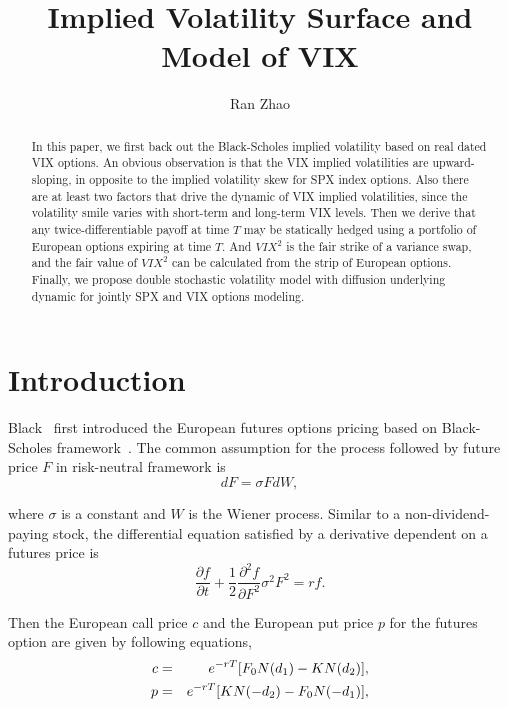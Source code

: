 \documentclass[11pt,reqno,final]{amsart}
\title{Implied Volatility Surface and Model of VIX}
\author{Ran Zhao}
\begin{document}
\begin{abstract}
In this paper, we first back out the Black-Scholes implied volatility based on real dated VIX options. An obvious observation is that the VIX implied volatilities are upward-sloping, in opposite to the implied volatility skew for SPX index options. Also there are at least two factors that drive the dynamic of VIX implied volatilities, since the volatility smile varies with short-term and long-term VIX levels. Then we derive that any twice-differentiable payoff at time $T$ may be statically hedged using a portfolio of European options expiring at time $T$. And $VIX^2$ is the fair strike of a variance swap, and the fair value of $VIX^2$ can be calculated from the strip of European options. Finally, we propose double stochastic volatility model with diffusion underlying dynamic for jointly SPX and VIX options modeling.
\end{abstract}

\maketitle
%
%
%
\section{Introduction}
Black~\cite{Black76} first introduced the European futures options pricing based on Black-Scholes framework~\cite{BS73}. The common assumption for the process followed by future price $F$ in risk-neutral framework is
\begin{equation}
dF=\sigma F dW,
\end{equation}

where $\sigma$ is a constant and $W$ is the Wiener process. Similar to a non-dividend-paying stock, the differential equation satisfied by a derivative dependent on a futures price is
$$
\frac{\partial f}{\partial t} + \frac{1}{2} \frac{\partial^2 f}{\partial F^2} \sigma^2 F^2 = rf.
$$

Then the European call price $c$ and the European put price $p$ for the futures option are given by following equations,
\begin{eqnarray}
c &=& e^{-rT}[F_0 N(d_1) - KN(d_2)],  \label{eqn::future_bs} \\
p &=& e^{-rT}[K N(-d_2) - F_0 N(-d_1)], \notag \\
\end{eqnarray}
\end{document}
